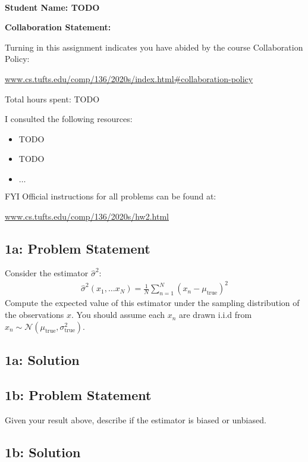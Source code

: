 \documentclass[12pt]{article}
\newcommand{\officialdirections}[1]{{\color{blue} #1}}
\begin{document}
~~\\ %

{\Large{\bf Student Name: TODO}}

{\Large{\bf Collaboration Statement:}}

Turning in this assignment indicates you have abided by the course Collaboration Policy:

\url{www.cs.tufts.edu/comp/136/2020s/index.html#collaboration-policy}

Total hours spent: TODO

I consulted the following resources:
\begin{itemize}
\item TODO
\item TODO
\item $\ldots$	
\end{itemize}

FYI Official instructions for all problems can be found at:

\url{www.cs.tufts.edu/comp/136/2020s/hw2.html}


\tableofcontents

\newpage
\officialdirections{
\subsection*{1a: Problem Statement}

Consider the estimator $\hat{\sigma}^2$:
\begin{align}
\hat{\sigma}^2(x_1, \ldots x_N) = \frac{1}{N} \sum_{n=1}^N (x_n - \mu_{\text{true}})^2
\end{align}
Compute the expected value of this estimator under the sampling distribution of the observations $x$. You should assume each $x_n$ are drawn i.i.d from $x_n \sim \mathcal{N}( \mu_{\text{true}}, \sigma^2_{\text{true}})$.  
}

\subsection{1a: Solution}


\newpage
\officialdirections{
\subsection*{1b: Problem Statement}
Given your result above, describe if the estimator is biased or unbiased.
}

\subsection{1b: Solution}
\end{document}
